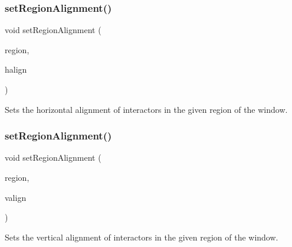 \subsubsection{\texorpdfstring{set\+Region\+Alignment()}{setRegionAlignment()}\hspace{0.1cm}{\footnotesize\ttfamily [1/5]}}
{\footnotesize\ttfamily void set\+Region\+Alignment (\begin{DoxyParamCaption}\item[{\mbox{\hyperlink{classsgl_1_1GWindow_a81a01a86de31071a92e6cce0bab9bc4b}{Region}}}]{region,  }\item[{\mbox{\hyperlink{namespacesgl_aa00e70829e72ff16addc4d9f06fe3bc5}{Horizontal\+Alignment}}}]{halign }\end{DoxyParamCaption})\hspace{0.3cm}{\ttfamily [virtual]}}



Sets the horizontal alignment of interactors in the given region of the window. 

\mbox{\label{classsgl_1_1GWindow_a926942899d029fc9921fe770ac2867bb}} 
\subsubsection{\texorpdfstring{set\+Region\+Alignment()}{setRegionAlignment()}\hspace{0.1cm}{\footnotesize\ttfamily [2/5]}}
{\footnotesize\ttfamily void set\+Region\+Alignment (\begin{DoxyParamCaption}\item[{\mbox{\hyperlink{classsgl_1_1GWindow_a81a01a86de31071a92e6cce0bab9bc4b}{Region}}}]{region,  }\item[{\mbox{\hyperlink{namespacesgl_a9c2ed22cfbd21f13df24ea193b310aee}{Vertical\+Alignment}}}]{valign }\end{DoxyParamCaption})\hspace{0.3cm}{\ttfamily [virtual]}}



Sets the vertical alignment of interactors in the given region of the window. 

\mbox{\label{classsgl_1_1GWindow_ab4d2bfcca7a18da2847e7b4494da4a16}} 
